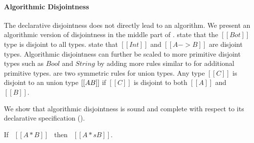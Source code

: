 \begin{comment}
\begin{figure}[t]
  \begin{small}
    \centering
    \drules[ad]{$[[A * B]]$}{Algorithmic Disjointness}{btmr, btml, intl, intr, orl, orr}
  \end{small}
  \caption{Algorithmic Disjointness for \cal.}
  \label{fig:union:ad}
\end{figure}
\end{comment}

\paragraph{Algorithmic Disjointness}
The declarative disjointness does not directly lead to an algorithm.
We present an algorithmic version of disjointness in
the middle part of .
 state that the $[[Bot]]$
type is disjoint to all types.   state that
$[[Int]]$ and $[[A -> B]]$ are disjoint types.  Algorithmic
disjointness can further be scaled to more primitive disjoint types
such as $Bool$ and $String$ by adding more rules similar to
 for additional primitive types.
 are two symmetric rules for union types. Any type $[[C]]$ is
disjoint to an union type $[[A \/ B]]$ if $[[C]]$ is disjoint to both
$[[A]]$ and $[[B]]$.

We show that algorithmic disjointness is sound and complete
with respect to its declarative specification ().

\begin{lemma}
  If \ $[[A * B]]$ \ then \ $[[A *s B]]$.
\label{lemma:union:disj-sound}
\end{lemma}

\begin{comment}
\begin{proof}
  By induction on algorithmic disjointness relation.
  \begin{itemize}
    \item Cases \rref{ad-btmr, ad-btml, ad-orl, ad-orr} require induction on hypothesis
          and \Cref{lemma:union:sub-or}.
    \item Cases \rref{ad-intl, ad-intr} require induction on type and \Cref{lemma:union:sub-or}.
  \end{itemize}
\end{proof}
\end{comment}

